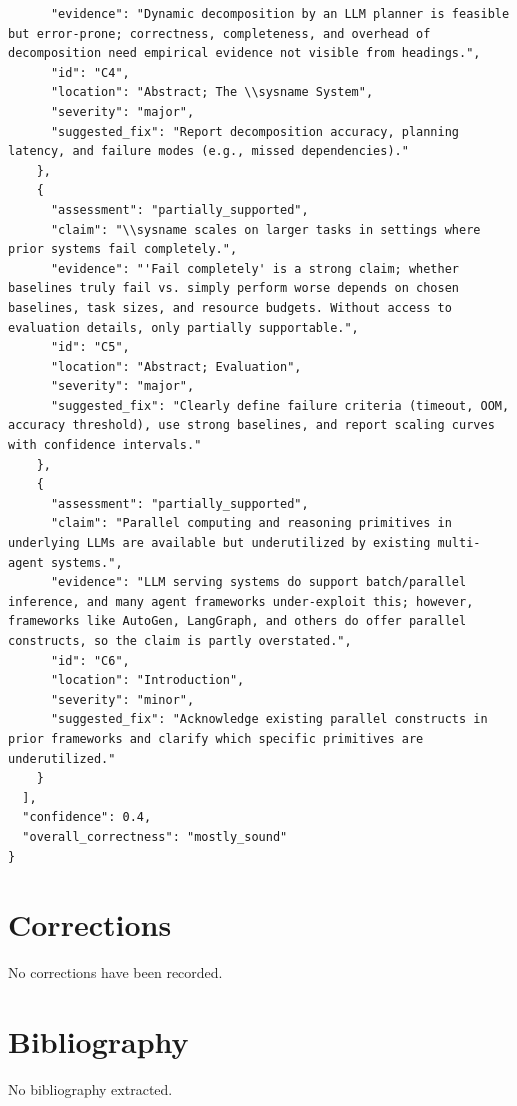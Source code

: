 \documentclass[11pt]{article}
\begin{document}
\begin{verbatim}
      "evidence": "Dynamic decomposition by an LLM planner is feasible but error-prone; correctness, completeness, and overhead of decomposition need empirical evidence not visible from headings.",
      "id": "C4",
      "location": "Abstract; The \\sysname System",
      "severity": "major",
      "suggested_fix": "Report decomposition accuracy, planning latency, and failure modes (e.g., missed dependencies)."
    },
    {
      "assessment": "partially_supported",
      "claim": "\\sysname scales on larger tasks in settings where prior systems fail completely.",
      "evidence": "'Fail completely' is a strong claim; whether baselines truly fail vs. simply perform worse depends on chosen baselines, task sizes, and resource budgets. Without access to evaluation details, only partially supportable.",
      "id": "C5",
      "location": "Abstract; Evaluation",
      "severity": "major",
      "suggested_fix": "Clearly define failure criteria (timeout, OOM, accuracy threshold), use strong baselines, and report scaling curves with confidence intervals."
    },
    {
      "assessment": "partially_supported",
      "claim": "Parallel computing and reasoning primitives in underlying LLMs are available but underutilized by existing multi-agent systems.",
      "evidence": "LLM serving systems do support batch/parallel inference, and many agent frameworks under-exploit this; however, frameworks like AutoGen, LangGraph, and others do offer parallel constructs, so the claim is partly overstated.",
      "id": "C6",
      "location": "Introduction",
      "severity": "minor",
      "suggested_fix": "Acknowledge existing parallel constructs in prior frameworks and clarify which specific primitives are underutilized."
    }
  ],
  "confidence": 0.4,
  "overall_correctness": "mostly_sound"
}
\end{verbatim}

\section*{Corrections}
No corrections have been recorded.

\section*{Bibliography}
No bibliography extracted.

% 
% 
\end{document}
